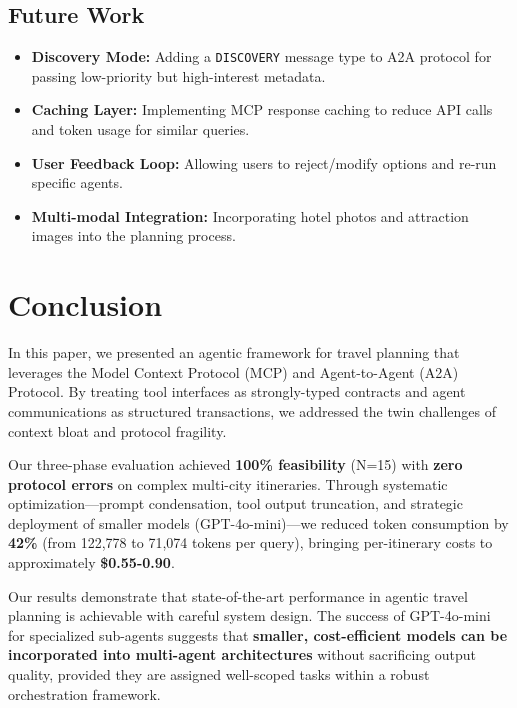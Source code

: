 \documentclass[10pt,twocolumn]{article}
\begin{document}
\subsection{Future Work}
\begin{itemize}
    \item \textbf{Discovery Mode:} Adding a \texttt{DISCOVERY} message type to A2A protocol for passing low-priority but high-interest metadata.
    \item \textbf{Caching Layer:} Implementing MCP response caching to reduce API calls and token usage for similar queries.
    \item \textbf{User Feedback Loop:} Allowing users to reject/modify options and re-run specific agents.
    \item \textbf{Multi-modal Integration:} Incorporating hotel photos and attraction images into the planning process.
\end{itemize}

\section{Conclusion}
In this paper, we presented an agentic framework for travel planning that leverages the Model Context Protocol (MCP) and Agent-to-Agent (A2A) Protocol. By treating tool interfaces as strongly-typed contracts and agent communications as structured transactions, we addressed the twin challenges of context bloat and protocol fragility. 

Our three-phase evaluation achieved \textbf{100\% feasibility} (N=15) with \textbf{zero protocol errors} on complex multi-city itineraries. Through systematic optimization---prompt condensation, tool output truncation, and strategic deployment of smaller models (GPT-4o-mini)---we reduced token consumption by \textbf{42\%} (from 122,778 to 71,074 tokens per query), bringing per-itinerary costs to approximately \textbf{\$0.55-0.90}.

Our results demonstrate that state-of-the-art performance in agentic travel planning is achievable with careful system design. The success of GPT-4o-mini for specialized sub-agents suggests that \textbf{smaller, cost-efficient models can be incorporated into multi-agent architectures} without sacrificing output quality, provided they are assigned well-scoped tasks within a robust orchestration framework.

{\small


}
\end{document}
